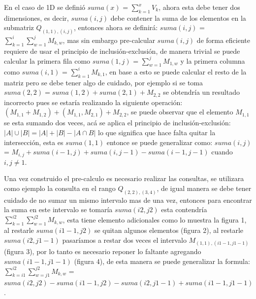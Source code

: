 \documentclass[12pt, a4paper]{article}
\begin{document}
	En el caso de 1D se definió $suma(x)$ = $\sum_{k=1}^{x} V_{k}$, ahora esta debe tener dos dimensiones, es decir, 
	$suma(i,j)$ debe contener la suma de los elementos en la submatriz $Q_{(1,1),(i,j)}$, entonces ahora se definirá:
	$suma(i,j)$ = $\sum_{k=1}^{i} \sum_{w=1}^{j} M_{k,w}$, mas sin embargo pre-calcular $suma(i,j)$ de forma eficiente
	requiere de usar el principio de inclusión-exclusión, de manera trivial se puede calcular la primera fila como
	$suma(1,j)$ = $\sum_{w=1}^{j} M_{1,w}$ y la primera columna como $suma(i,1)$ = $\sum_{k=1}^{i} M_{k,1}$, en base
	a esto se puede calcular el resto de la matriz pero se debe tener algo de cuidado, por ejemplo si se toma 
	$suma(2,2) = suma(1,2) + suma(2,1) + M_{2,2}$ se obtendría un resultado incorrecto pues se estaría realizando la
	siguiente operación: $(M_{1,1}+M_{1,2}) + (M_{1,1},M_{2,1}) + M_{2,2}$, se puede observar que el elemento 
	$M_{1,1}$ se esta sumando dos veces, acá se aplica el principio de inclusión-exclusión: 
	$|A| \cup |B| = |A| + |B| - |A \cap B|$ lo que significa que hace falta quitar la intersección, esta es 
	$suma(1,1)$ entonce se puede generalizar como: $suma(i,j)$ = $M_{i,j} + suma(i-1,j) + suma(i,j-1) - suma(i-1,j-1)$
	cuando $i,j \neq 1$.
	
	Una vez construido el pre-calculo es necesario realizar las consultas, se utilizara como ejemplo la consulta en
	el rango $Q_{(2,2),(3,4)}$, de igual manera se debe tener cuidado de no sumar un mismo intervalo mas de una vez,
	entonces para encontrar la suma en este intervalo se tomaría $suma(i2,j2)$ esta contendría 
	$\sum_{k=1}^{i2} \sum_{w=1}^{j2} M_{k,w}$, esta tiene elemento adicionales
	como lo muestra la figura 1, al restarle $suma(i1-1,j2)$ se quitan algunos elementos (figura 2), al restarle
	$suma(i2,j1-1)$ pasaríamos a restar dos veces el intervalo $M_{(1,1),(i1-1,j1-1)}$ (figura 3), por lo tanto es
	necesario reponer lo faltante agregando $suma(i1-1,j1-1)$ (figura 4), de esta manera se puede generalizar la 
	formula: $\sum_{k=i1}^{i2} \sum_{w=j1}^{j2} M_{k,w}$ = $suma(i2,j2)-suma(i1-1,j2)-suma(i2,j1-1)+suma(i1-1,j1-1)$.
	
\end{document}
